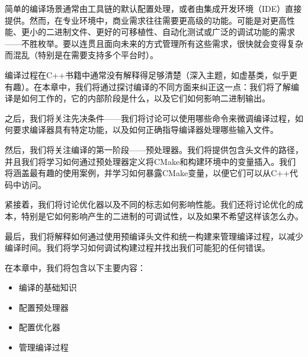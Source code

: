 简单的编译场景通常由工具链的默认配置处理，或者由集成开发环境（IDE）直接提供。然而，在专业环境中，商业需求往往需要更高级的功能。可能是对更高性能、更小的二进制文件、更好的可移植性、自动化测试或广泛的调试功能的需求——不胜枚举。要以连贯且面向未来的方式管理所有这些需求，很快就会变得复杂而混乱（特别是在需要支持多个平台时）。

编译过程在C++书籍中通常没有解释得足够清楚（深入主题，如虚基类，似乎更有趣）。在本章中，我们将通过探讨编译的不同方面来纠正这一点：我们将了解编译是如何工作的，它的内部阶段是什么，以及它们如何影响二进制输出。

之后，我们将关注先决条件——我们将讨论可以使用哪些命令来微调编译过程，如何要求编译器具有特定功能，以及如何正确指导编译器处理哪些输入文件。

然后，我们将关注编译的第一阶段——预处理器。我们将提供包含头文件的路径，并且我们将学习如何通过预处理器定义将CMake和构建环境中的变量插入。我们将涵盖最有趣的使用案例，并学习如何暴露CMake变量，以便它们可以从C++代码中访问。

紧接着，我们将讨论优化器以及不同的标志如何影响性能。我们还将讨论优化的成本，特别是它如何影响产生的二进制的可调试性，以及如果不希望这样该怎么办。

最后，我们将解释如何通过使用预编译头文件和统一构建来管理编译过程，以减少编译时间。我们将学习如何调试构建过程并找出我们可能犯的任何错误。

在本章中，我们将包含以下主要内容：

\begin{itemize}
\item
编译的基础知识

\item
配置预处理器

\item
配置优化器

\item
管理编译过程
\end{itemize}







